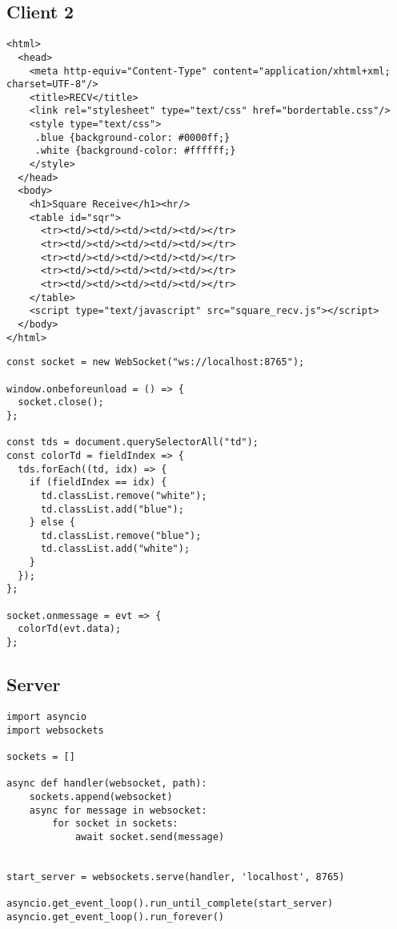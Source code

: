 \documentclass[11pt]{article}
\begin{document}
\subsection{Client 2}
\label{sec:org380e90e}
\lstset{breaklines=true,language=HTML,label= ,caption= ,captionpos=b,numbers=none}
\begin{lstlisting}
<html>
  <head>
    <meta http-equiv="Content-Type" content="application/xhtml+xml; charset=UTF-8"/>
    <title>RECV</title>
    <link rel="stylesheet" type="text/css" href="bordertable.css"/>
    <style type="text/css">
     .blue {background-color: #0000ff;}
     .white {background-color: #ffffff;}
    </style>
  </head>
  <body>
    <h1>Square Receive</h1><hr/>
    <table id="sqr">
      <tr><td/><td/><td/><td/><td/></tr>
      <tr><td/><td/><td/><td/><td/></tr>
      <tr><td/><td/><td/><td/><td/></tr>
      <tr><td/><td/><td/><td/><td/></tr>
      <tr><td/><td/><td/><td/><td/></tr>
    </table>
    <script type="text/javascript" src="square_recv.js"></script>
  </body>
</html>
\end{lstlisting}
\lstset{breaklines=true,language=javascript,label= ,caption= ,captionpos=b,numbers=none}
\begin{lstlisting}
const socket = new WebSocket("ws://localhost:8765");

window.onbeforeunload = () => {
  socket.close();
};

const tds = document.querySelectorAll("td");
const colorTd = fieldIndex => {
  tds.forEach((td, idx) => {
    if (fieldIndex == idx) {
      td.classList.remove("white");
      td.classList.add("blue");
    } else {
      td.classList.remove("blue");
      td.classList.add("white");
    }
  });
};

socket.onmessage = evt => {
  colorTd(evt.data);
};
\end{lstlisting}
\subsection{Server}
\label{sec:orgdb6784a}
\lstset{breaklines=true,language=Python,label= ,caption= ,captionpos=b,numbers=none}
\begin{lstlisting}
import asyncio
import websockets

sockets = []

async def handler(websocket, path):
    sockets.append(websocket)
    async for message in websocket:
        for socket in sockets:
            await socket.send(message)


start_server = websockets.serve(handler, 'localhost', 8765)

asyncio.get_event_loop().run_until_complete(start_server)
asyncio.get_event_loop().run_forever()
\end{lstlisting}
\end{document}
